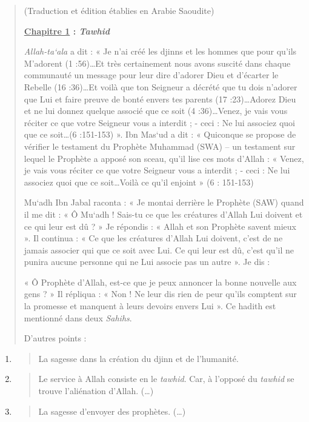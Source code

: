 \begin{quote}
(Traduction et édition établies en Arabie Saoudite)

\textbf{\underline{Chapitre 1} : \emph{Tawhid}}

\emph{Allah-ta`ala} a dit : « Je n'ai créé les djinns et les hommes que
pour qu'ils M'adorent (1 :56)\ldots Et très certainement nous avons
suscité dans chaque communauté un message pour leur dire d'adorer Dieu
et d'écarter le Rebelle (16 :36)\ldots Et voilà que ton Seigneur a
décrété que tu dois n'adorer que Lui et faire preuve de bonté envers tes
parents (17 :23)\ldots Adorez Dieu et ne lui donnez quelque associé que
ce soit (4 :36)\ldots Venez, je vais vous réciter ce que votre Seigneur
vous a interdit ; - ceci : Ne lui associez quoi que ce soit\ldots(6
:151-153) ». Ibn Mas`ud a dit : « Quiconque se propose de vérifier le
testament du Prophète Muhammad (SWA) -- un testament sur lequel le
Prophète a apposé son sceau, qu'il lise ces mots d'Allah : « Venez, je
vais vous réciter ce que votre Seigneur vous a interdit ; - ceci : Ne
lui associez quoi que ce soit\ldots Voilà ce qu'il enjoint » (6 :
151-153)

Mu`adh Ibn Jabal raconta : « Je montai derrière le Prophète (SAW) quand
il me dit : « Ô Mu`adh ! Sais-tu ce que les créatures d'Allah Lui
doivent et ce qui leur est dû ? » Je répondis : « Allah et son Prophète
savent mieux ». Il continua : « Ce que les créatures d'Allah Lui
doivent, c'est de ne jamais associer qui que ce soit avec Lui. Ce qui
leur est dû, c'est qu'il ne punira aucune personne qui ne Lui associe
pas un autre ». Je dis :

« Ô Prophète d'Allah, est-ce que je peux annoncer la bonne nouvelle aux
gens ? » Il répliqua : « Non ! Ne leur dis rien de peur qu'ils comptent
sur la promesse et manquent à leurs devoirs envers Lui ». Ce hadith est
mentionné dans deux \emph{Sahihs}.

D'autres points :
\end{quote}

\begin{enumerate}
\def\labelenumi{\arabic{enumi}.}
\item
  \begin{quote}
  La sagesse dans la création du djinn et de l'humanité.
  \end{quote}
\item
  \begin{quote}
  Le service à Allah consiste en le \emph{tawhid}. Car, à l'opposé du
  \emph{tawhid} se trouve l'aliénation d'Allah. (\ldots)
  \end{quote}
\item
  \begin{quote}
  La sagesse d'envoyer des prophètes. (\ldots)
  \end{quote}
\end{enumerate}

